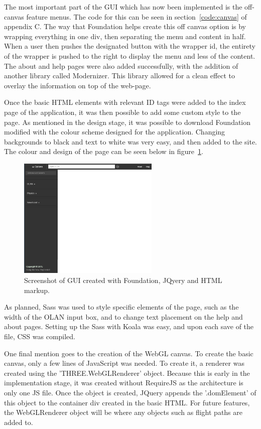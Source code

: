 The most important part of the GUI which has now been implemented is the off-canvas feature menus. The code for this can be seen in section~\ref{code:canvas} of appendix C. The way that Foundation helps create this off canvas option is by wrapping everything in one div, then separating the menu and content in half. When a user then pushes the designated button with the wrapper id, the entirety of the wrapper is pushed to the right to display the menu and less of the content. The about and help pages were also added successfully, with the addition of another library called Modernizer. This library allowed for a clean effect to overlay the information on top of the web-page.

Once the basic HTML elements with relevant ID tags were added to the index page of the application, it was then possible to add some custom style to the page. As mentioned in the design stage, it was possible to download Foundation modified with the colour scheme designed for the application. Changing backgrounds to black and text to white was very easy, and then added to the site. The colour and design of the page can be seen below in figure~\ref{fig:newgui}.

\begin{figure}[h]
  \centering
      \includegraphics[width=0.6\textwidth]{images/desktopProgress.png}
  \caption{Screenshot of GUI created with Foundation, JQyery and HTML markup.}
  \label{fig:newgui}
\end{figure}

As planned, Sass was used to style specific elements of the page, such as the width of the OLAN input box, and to change text placement on the help and about pages. Setting up the Sass with Koala was easy, and upon each save of the file, CSS was compiled. 

One final mention goes to the creation of the WebGL canvas. To create the basic canvas, only a few lines of JavaScript was needed. To create it, a renderer was created using the 'THREE.WebGLRenderer' object. Because this is early in the implementation stage, it was created without RequireJS as the architecture is only one JS file. Once the object is created, JQuery appends the '.domElement' of this object to the container div created in the basic HTML. For future features, the WebGLRenderer object will be where any objects such as flight paths are added to.

